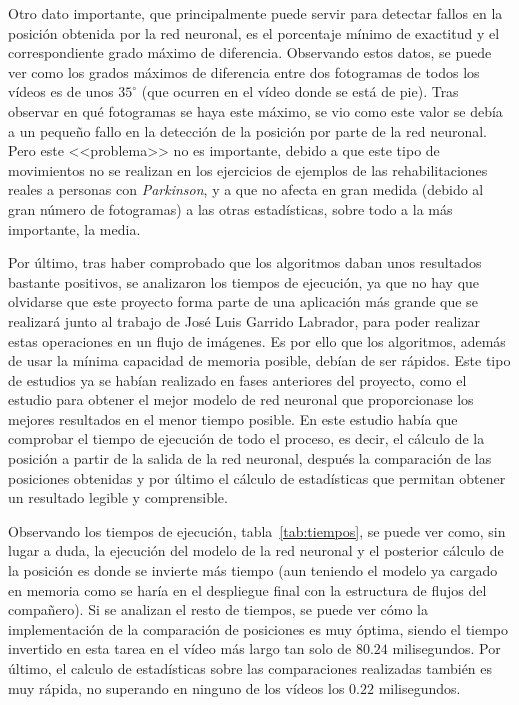 {Otro dato importante, que principalmente puede servir para detectar fallos en la posición obtenida por la red neuronal, es el porcentaje mínimo de exactitud y el correspondiente grado máximo de diferencia. Observando estos datos, se puede ver como los grados máximos de diferencia entre dos fotogramas de todos los vídeos es de unos $35^{\circ}$ (que ocurren en el vídeo donde se está de pie). Tras observar en qué fotogramas se haya este máximo, se vio como este valor se debía a un pequeño fallo en la detección de la posición por parte de la red neuronal. Pero este <<problema>> no es importante, debido a que este tipo de movimientos no se realizan en los ejercicios de ejemplos de las rehabilitaciones reales a personas con \textit{Parkinson}, y a que no afecta en gran medida (debido al gran número de fotogramas) a las otras estadísticas, sobre todo a la más importante, la media.

Por último, tras haber comprobado que los algoritmos daban unos resultados bastante positivos, se analizaron los tiempos de ejecución, ya que no hay que olvidarse que este proyecto forma parte de una aplicación más grande que se realizará junto al trabajo de José Luis Garrido Labrador, para poder realizar estas operaciones en un flujo de imágenes. Es por ello que los algoritmos, además de usar la mínima capacidad de memoria posible, debían de ser rápidos. Este tipo de estudios ya se habían realizado en fases anteriores del proyecto, como el estudio  para obtener el mejor modelo de red neuronal que proporcionase los mejores resultados en el menor tiempo posible. En este estudio había que comprobar el tiempo de ejecución de todo el proceso, es decir,  el cálculo de la posición a partir de la salida de la red neuronal, después la comparación de las posiciones obtenidas y por último el cálculo de estadísticas que permitan obtener un resultado legible y comprensible.

Observando los tiempos de ejecución, tabla~\ref{tab:tiempos}, se puede ver como, sin lugar a duda, la ejecución del modelo de la red neuronal y el posterior cálculo de la posición es donde se invierte más tiempo (aun teniendo el modelo ya cargado en memoria como se haría en el despliegue final con la estructura de flujos del compañero). Si se analizan el resto de tiempos, se puede ver cómo la implementación de la comparación de posiciones es muy óptima, siendo el tiempo invertido en esta tarea en el vídeo más largo tan solo de $80.24$ milisegundos. Por último, el calculo de estadísticas sobre las comparaciones realizadas también es muy rápida, no superando en ninguno de los vídeos los $0.22$ milisegundos.

}
